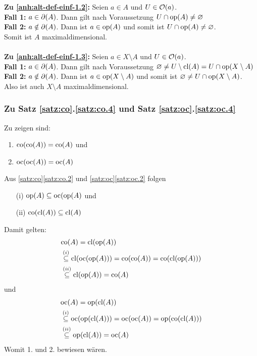     \noindent
    \textbf{Zu \ref{anh:alt-def-einf-1.2}: }
        Seien ${a \in A}$ und $U \in \mathcal{O}(a)$.\\
        \textbf{Fall 1:} ${a \in \partial(A)}$.
            Dann gilt nach Voraussetzung $U \cap \text{op}(A) \neq \varnothing$\\
        \textbf{Fall 2:} ${a \notin \partial(A)}$.
            Dann ist $a \in \text{op}(A)$ und somit ist $U \cap \text{op}(A) \neq \varnothing$.\\
        Somit ist $A$ maximaldimensional.
        \\ \ \\
    \textbf{Zu \ref{anh:alt-def-einf-1.3}: }
        Seien ${a \in X \setminus A}$ und $U \in \mathcal{O}(a)$.\\
        \textbf{Fall 1:} ${a \in \partial(A)}$.
            Dann gilt nach Voraussetzung $\varnothing \neq U \setminus \text{cl}(A) = U \cap \text{op}(X \setminus A)$\\
        \textbf{Fall 2:} ${a \notin \partial(A)}$.
            Dann ist $a \in \text{op}(X \setminus A)$ und somit ist $\varnothing \neq U \cap \text{op}(X \setminus A)$.\\
        Also ist auch $X \setminus A$ maximaldimensional.
            
            
\subsubsection{Zu Satz \ref{satz:co}.\ref{satz:co.4} und Satz \ref{satz:oc}.\ref{satz:oc.4}}\label{anh:co.4-oc.4}
    Zu zeigen sind:
    \begin{enumerate}
        \item $\text{co}(\text{co}(A)) = \text{co}(A)$ \quad und
        \item $\text{oc}(\text{oc}(A)) = \text{oc}(A)$
    \end{enumerate}
    Aus \ref{satz:co}\ref{satz:co.2} und \ref{satz:oc}\ref{satz:oc.2} folgen
    \begin{itemize}
        \item[(i)] $\text{op}(A) \subseteq \text{oc}(\text{op}(A)$ \quad und 
        \item[(ii)] $\text{co}(\text{cl}(A)) \subseteq \text{cl}(A)$
    \end{itemize}
    Damit gelten:
    \begin{align*}
        &\text{co}(A) = \text{cl}(\text{op}(A)) \\
        &\overset{(i)}{\subseteq} \text{cl}(\text{oc}(\text{op}(A))) = \text{co}(\text{co}(A)) = \text{co}(\text{cl}(\text{op}(A))) \\
        &\overset{(ii)}{\subseteq} \text{cl}(\text{op}(A)) = \text{co}(A)
    \end{align*}
    und
    \begin{align*}
        &\text{oc}(A) = \text{op}(\text{cl}(A)) \\
        &\overset{(i)}{\subseteq} \text{oc}(\text{op}(\text{cl}(A))) = \text{oc}(\text{oc}(A)) = \text{op}(\text{co}(\text{cl}(A)))\\
        &\overset{(ii)}{\subseteq} \text{op}(\text{cl}(A))= \text{oc}(A)
    \end{align*}
    Womit 1. und 2. bewiesen wären.


